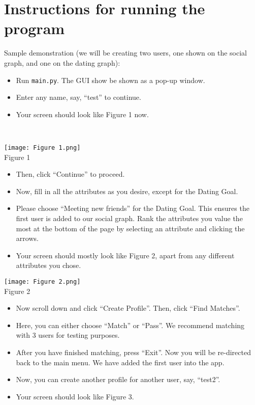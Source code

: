 \documentclass[fontsize=11pt]{article}
\begin{document}
\section{Instructions for running the program}
Sample demonstration (we will be creating two users, one shown on the social graph, and one on the dating graph):
\begin{itemize}
    \item Run \texttt{main.py}. The GUI show be shown as a pop-up window.
    \item Enter any name, say, ``test” to continue.
    \item Your screen should look like Figure 1 now.
\end{itemize}
\\
\begin{center}
\texttt{[image: Figure 1.png]}
\\
\caption{Figure 1}
\end{center}
\newpage
\begin{itemize}
    \item Then, click ``Continue” to proceed.
    \item Now, fill in all the attributes as you desire, except for the Dating Goal.
    \item Please choose ``Meeting new friends” for the Dating Goal. This ensures the first user is added to our social graph. Rank the attributes you value the most at the bottom of the page by selecting an attribute and clicking the arrows.
    \item Your screen should mostly look like Figure 2, apart from any different attributes you chose.
\end{itemize}
\begin{center}
\texttt{[image: Figure 2.png]}
\\
\caption{Figure 2}
\end{center}
\newpage
\begin{itemize}
    \item Now scroll down and click ``Create Profile”. Then, click ``Find Matches”.
    \item Here, you can either choose ``Match” or ``Pass”. We recommend matching with 3 users for testing purposes.
    \item After you have finished matching, press ``Exit”. Now you will be re-directed back to the main menu. We have added the first user into the app.
    \item Now, you can create another profile for another user, say, ``test2”.
    \item Your screen should look like Figure 3.
\end{itemize}
\end{document}
